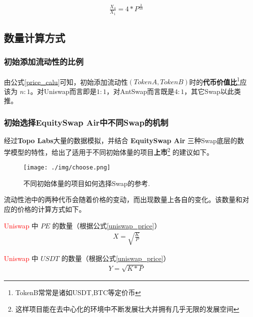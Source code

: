 \documentclass{article}
\begin{document}
\begin{equation} \label{uniswap_antswap_price_relative_x}
\begin{split}
\frac{X_4}{X_1} = 4*P^\frac{3}{10}
\end{split}
\end{equation}

\subsection{数量计算方式}

\subsubsection*{初始添加流动性的比例}

由公式\ref{price_calu}可知，初始添加流动性$(TokenA, TokenB)$时的\textbf{代币价值比}\footnote{TokenB常常是诸如USDT,BTC等定价币}应该为 $n:1$。对Uniswap而言即是$1:1$，对AntSwap而言既是$4:1$，其它Swap以此类推。

\subsubsection*{初始选择EquitySwap Air中不同Swap的机制}

经过\textbf{Topo Labs}大量的数据模拟，并结合 \textbf{EquitySwap Air} 三种Swap底层的数学模型的特性，给出了适用于不同初始体量的项目\textbf{上市}\footnote{这样项目能在去中心化的环境中不断发展壮大并拥有几乎无限的发展空间} 的建议如下。

\begin{figure}[H]
\centering
\texttt{[image: ./img/choose.png]}
\caption{\label{fig}不同初始体量的项目如何选择Swap的参考.}
\end{figure}


流动性池中的两种代币会随着价格的变动，而出现数量上各自的变化。该数量和对应的价格的计算方式如下。

\textcolor{red}{Uniswap} 中 $PE$ 的数量（根据公式\ref{uniswap_price}）
\begin{equation} \label{uniswap_count_eth}
\begin{split}
X = \sqrt{\frac{K}{P}}
\end{split}
\end{equation}

\textcolor{red}{Uniswap} 中 $USDT$ 的数量（根据公式\ref{uniswap_price}）
\begin{equation} \label{uniswap_count_usdt}
\begin{split}
Y = \sqrt{K * P}
\end{split}
\end{equation}
\end{document}
